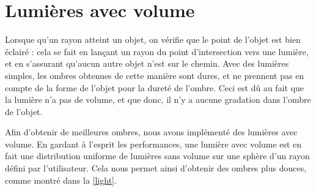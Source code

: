 \documentclass{article}
\begin{document}
\section{Lumières avec volume}

Lorsque qu'un rayon atteint un objet, on vérifie que le point de l'objet est
bien éclairé : cela se fait en lançant un rayon du point d'intersection vers une
lumière, et en s'assurant qu'aucun autre objet n'est sur le chemin. Avec des
lumières simples, les ombres obtenues de cette manière sont dures, et ne
prennent pas en compte de la forme de l'objet pour la dureté de l'ombre.
Ceci est dû au fait que la lumière n'a pas de volume, et que donc, il n'y a
aucune gradation dans l'ombre de l'objet.

Afin d'obtenir de meilleures ombres, nous avons implémenté des lumières avec
volume. En gardant à l'esprit les performances, une lumière avec volume est en
fait une distribution uniforme de lumières sans volume sur une sphère d'un
rayon défini par l'utilisateur. Cela nous permet ainsi d'obtenir des ombres plus
douces, comme montré dans la \cref{light}.
\end{document}
